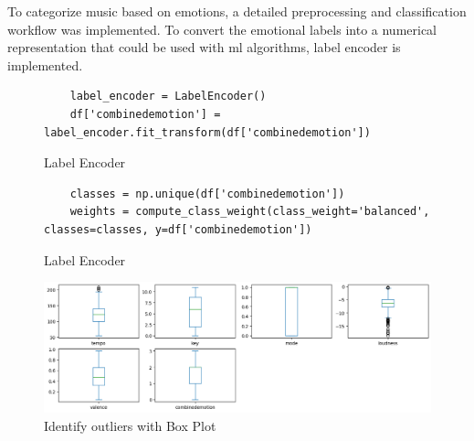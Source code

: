 

\label{app:appendix-a}
\setcounter{figure}{0}
\setcounter{table}{0} 
To categorize music based on emotions, a detailed preprocessing and classification workflow was implemented.
To convert the emotional labels into a numerical representation that could be used with \gls{ml} algorithms, label encoder is implemented.
\begin{figure}[H]
    \begin{verbatim}
    label_encoder = LabelEncoder()
    df['combinedemotion'] = label_encoder.fit_transform(df['combinedemotion'])
    \end{verbatim}
    \caption{Label Encoder}
    \label{fig:label-encoder}
\end{figure}
\begin{figure}[H]
    \begin{verbatim}
    classes = np.unique(df['combinedemotion'])
    weights = compute_class_weight(class_weight='balanced', classes=classes, y=df['combinedemotion'])
    \end{verbatim}
    \caption{Label Encoder}
    \label{fig:label-encoder}
\end{figure}
\begin{figure}[H]
    \centering
    \includegraphics[width=14cm]{Images/music-class-box.png}
    \caption{Identify outliers with Box Plot}
    \label{fig:box-plot}
\end{figure}
